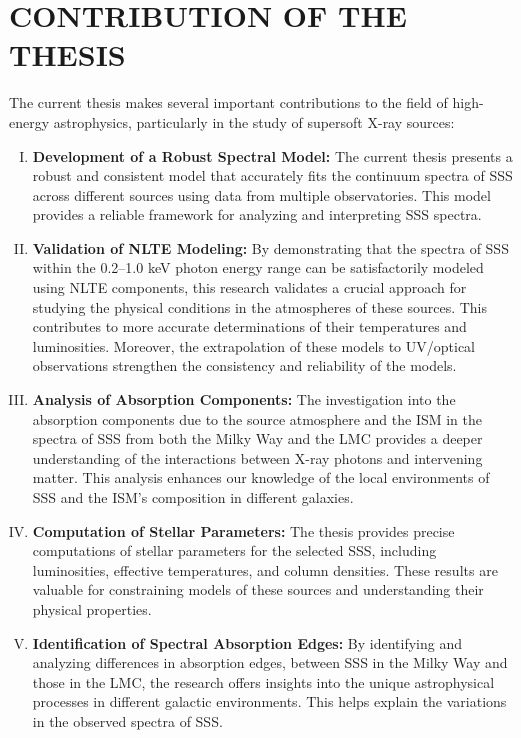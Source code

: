     \section{\MakeUppercase{Contribution of the Thesis}} \label{introduction:thesis_contribution}
    	The current thesis makes several important contributions to the field of high-energy astrophysics, particularly in the study of supersoft X-ray sources:
    	\begin{enumerate}[I.]
    		\item \textbf{Development of a Robust Spectral Model:} The current thesis presents a robust and consistent model that accurately fits the continuum spectra of SSS across different sources using data from multiple observatories. This model provides a reliable framework for analyzing and interpreting SSS spectra.
    		
    		\item \textbf{Validation of NLTE Modeling:} By demonstrating that the spectra of SSS within the 0.2--1.0 keV photon energy range can be satisfactorily modeled using NLTE components, this research validates a crucial approach for studying the physical conditions in the atmospheres of these sources. This contributes to more accurate determinations of their temperatures and luminosities. Moreover, the extrapolation of these models to UV/optical observations strengthen the consistency and reliability of the models.
    		
    		\item \textbf{Analysis of Absorption Components:} The investigation into the absorption components due to the source atmosphere and the ISM in the spectra of SSS from both the Milky Way and the LMC provides a deeper understanding of the interactions between X-ray photons and intervening matter. This analysis enhances our knowledge of the local environments of SSS and the ISM's composition in different galaxies.
    		
    		\item \textbf{Computation of Stellar Parameters:} The thesis provides precise computations of stellar parameters for the selected SSS, including luminosities, effective temperatures, and column densities. These results are valuable for constraining models of these sources and understanding their physical properties.
    		
    		\item \textbf{Identification of Spectral Absorption Edges:} By identifying and analyzing differences in absorption edges, between SSS in the Milky Way and those in the LMC, the research offers insights into the unique astrophysical processes in different galactic environments. This helps explain the variations in the observed spectra of SSS.
    		

\end{enumerate}
